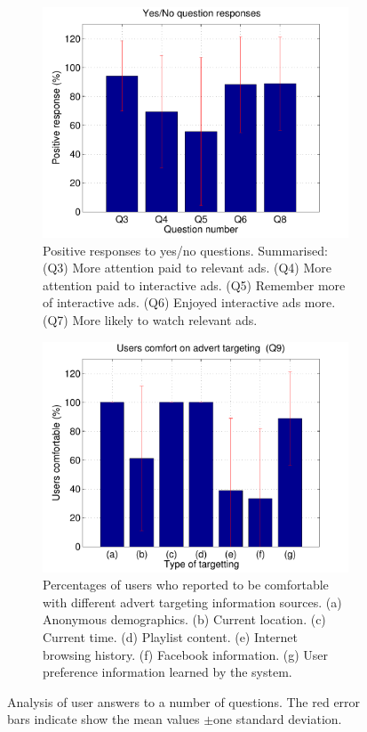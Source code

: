 	\begin{figure}[h!]
		\centering
		\begin{subfigure}[t]{0.49\textwidth}
			\centering
			\includegraphics[width=\textwidth]{images/yesno_results.pdf}
			\caption{Positive responses to yes/no questions. Summarised:
				(Q3) More attention paid to relevant ads.
				(Q4) More attention paid to interactive ads.
				(Q5) Remember more of interactive ads.
				(Q6) Enjoyed interactive ads more.
				(Q7) More likely to watch relevant ads.
			}
		\end{subfigure}
		\begin{subfigure}[t]{0.49\textwidth}
			\centering
			\includegraphics[width=\textwidth]{images/targeting.pdf}
			\caption{Percentages of users who reported to be comfortable with different advert targeting information sources. (a) Anonymous demographics. (b) Current location. (c) Current time. (d) Playlist content. (e) Internet browsing history. (f) Facebook information. (g) User preference information learned by the system.}
		\end{subfigure}
		\caption{Analysis of user answers to a number of questions. The red error bars indicate show the mean values $\pm$one standard deviation.}
		\label{fig:qualitative_results}
	\end{figure}

